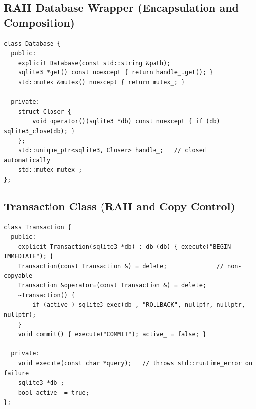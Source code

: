 \documentclass[12pt,a4paper,oneside]{book}
\begin{document}
\subsection{RAII Database Wrapper (Encapsulation and Composition)}
\begin{lstlisting}[caption={\texttt{Database} class: owns the SQLite connection and its mutex}, label={lst:db}]
class Database {
  public:
    explicit Database(const std::string &path);
    sqlite3 *get() const noexcept { return handle_.get(); }
    std::mutex &mutex() noexcept { return mutex_; }

  private:
    struct Closer {
        void operator()(sqlite3 *db) const noexcept { if (db) sqlite3_close(db); }
    };
    std::unique_ptr<sqlite3, Closer> handle_;   // closed automatically
    std::mutex mutex_;
};
\end{lstlisting}

\subsection{Transaction Class (RAII and Copy Control)}
\begin{lstlisting}[caption={\texttt{sql::Transaction}: rollback in the destructor unless committed}, label={lst:tx}]
class Transaction {
  public:
    explicit Transaction(sqlite3 *db) : db_(db) { execute("BEGIN IMMEDIATE"); }
    Transaction(const Transaction &) = delete;              // non-copyable
    Transaction &operator=(const Transaction &) = delete;
    ~Transaction() {
        if (active_) sqlite3_exec(db_, "ROLLBACK", nullptr, nullptr, nullptr);
    }
    void commit() { execute("COMMIT"); active_ = false; }

  private:
    void execute(const char *query);   // throws std::runtime_error on failure
    sqlite3 *db_;
    bool active_ = true;
};
\end{lstlisting}
\end{document}
